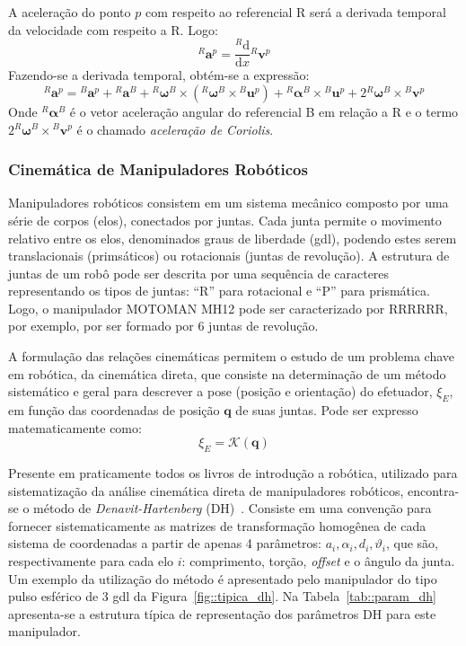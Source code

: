 A aceleração do ponto $p$ com respeito ao referencial R será a derivada temporal
da velocidade com respeito a R. Logo:
%
\begin{equation}
	^{R}\mathbf{a}^{p} = \frac{^{R}\mathrm{d} }{\mathrm{d} x} {^{R}\mathbf{v}^{p}}
\end{equation}
%
Fazendo-se a derivada temporal, obtém-se a expressão:
%
\begin{equation}
	^{R}\mathbf{a}^{p} = {}^{B}\mathbf{a}^{p} + {}^{R}\mathbf{a}^{B} +
	{}^{R}\boldsymbol{\omega}^{B} \times ({}^{R}\boldsymbol{\omega}^{B} \times
	{}^{B}\mathbf{u}^{p}) + {}^{R}\boldsymbol{\alpha}^{B} \times {}^{B}\mathbf{u}^{p}
	+ 2{}^{R}\boldsymbol{\omega}^{B} \times {}^{B}\mathbf{v}^{p}
\end{equation}
%
Onde ${}^{R}\boldsymbol{\alpha}^{B}$ é o vetor aceleração angular do referencial
B em relação a R e o termo $2{}^{R}\boldsymbol{\omega}^{B} \times
{}^{B}\mathbf{v}^{p}$ é o chamado \emph{aceleração de Coriolis}. 


\subsubsection{Cinemática de Manipuladores Robóticos}

Manipuladores robóticos consistem em um sistema mecânico composto por uma série
de corpos (elos), conectados por juntas. Cada junta permite o movimento relativo
entre os elos, denominados graus de liberdade (gdl), podendo estes serem
translacionais (primsáticos) ou rotacionais (juntas de revolução). A estrutura de juntas de um
robô pode ser descrita por uma sequência de caracteres representando os tipos de
juntas: ``R'' para rotacional e ``P'' para prismática. Logo, o manipulador
MOTOMAN MH12 pode ser caracterizado por RRRRRR, por exemplo, por ser formado por
6 juntas de revolução.

A formulação das relações cinemáticas permitem o estudo de um problema chave em
robótica, da cinemática direta, que consiste na determinação de um método
sistemático e geral para descrever a pose (posição e orientação) do efetuador,
$\xi_{E}$, em função das coordenadas de posição $\mathbf{q}$ de suas
juntas.
Pode ser expresso matematicamente como:
%
\begin{equation}
	\xi_{E} = \mathcal{K}(\mathbf{q})
\end{equation}
%

Presente em praticamente todos os livros de introdução a robótica, utilizado
para sistematização da análise cinemática direta de manipuladores robóticos,
encontra-se o método de \emph{Denavit-Hartenberg} (DH)~\cite{denavit1955}.
Consiste em uma convenção para fornecer sistematicamente as matrizes de
transformação homogênea de cada sistema de coordenadas a partir de apenas 4
parâmetros:
$a_i, \alpha_i, d_i, \vartheta_i$, que são, respectivamente para cada elo $i$:
comprimento, torção, \textit{offset} e o ângulo da junta.
Um exemplo da utilização do método é apresentado pelo manipulador do tipo pulso
esférico de 3 gdl da Figura~\ref{fig::tipica_dh}. Na Tabela~\ref{tab::param_dh}
apresenta-se a estrutura típica de representação dos parâmetros DH para este
manipulador.


